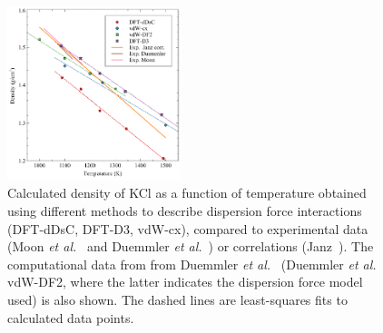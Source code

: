 \documentclass[preprint,3p,10pt,twocolumn,number,sort&compress]{elsarticle}
\begin{document}

\begin{figure}[htb]
\centering
\includegraphics[width=0.45\textwidth]{ben_fig1.pdf}
\caption{Calculated density of KCl as a function of temperature obtained using different methods to describe dispersion force interactions (DFT-dDsC, DFT-D3, vdW-cx), compared to experimental data (Moon \textit{et al.}~\cite{Moon} and Duemmler \textit{et al.}~\cite{DUEMMLER2022153414}) or correlations (Janz~\cite{Janz1988}). The computational data from 
from Duemmler \textit{et al.}~\cite{DUEMMLER2022153414} (Duemmler \textit{et al.} vdW-DF2, where the latter indicates the dispersion force model used) is also shown. The dashed lines are least-squares fits to calculated data points.} 
\label{fig:KCl}
\end{figure}
\end{document}
